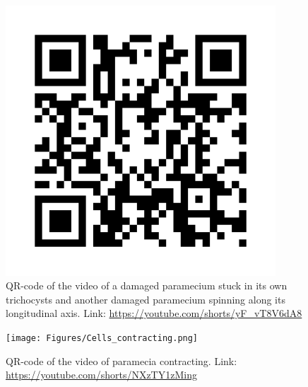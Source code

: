 \begin{minipage}{0.49\textwidth}
\begin{figure}[H]
\centering 
\captionsetup{width=0.98\linewidth, justification=centering}
\includegraphics[width=0.9\textwidth]{Figures/Swimming_Damaged_Paramecium.png}
\caption{QR-code of the video of a damaged paramecium stuck in its own trichocysts and another damaged paramecium spinning along its longitudinal axis. Link: \url{https://youtube.com/shorts/yF_vT8V6dA8}}
\label{fig:Swimming_Damaged_Paramecium}
\end{figure}
\end{minipage}

\begin{figure}[H]
\centering
\captionsetup{width=0.9\linewidth, justification=centering}
\texttt{[image: Figures/Cells\_contracting.png]}
\caption{QR-code of the video of paramecia contracting. Link: \url{https://youtube.com/shorts/NXzTY1zMing}}
\label{fig:Cells_contracting}
\end{figure}   


